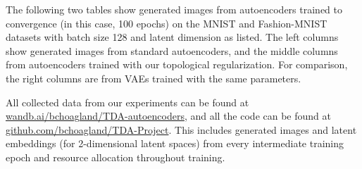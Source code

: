 \documentclass[conference]{IEEEtran}
\begin{document}
The following two tables show generated images from autoencoders trained to convergence (in this case, 100 epochs) on the MNIST and Fashion-MNIST datasets with batch size 128 and latent dimension as listed. The left columns show generated images from standard autoencoders, and the middle columns from autoencoders trained with our topological regularization. For comparison, the right columns are from VAEs trained with the same parameters.

All collected data from our experiments can be found at \href{https://wandb.ai/bchoagland/TDA-autoencoders}{\color{blue}wandb.ai/bchoagland/TDA-autoencoders}, and all the code can be found at \href{https://github.com/BCHoagland/TDA-Project}{\color{blue}github.com/bchoagland/TDA-Project}. This includes generated images and latent embeddings (for 2-dimensional latent spaces) from every intermediate training epoch and resource allocation throughout training.
\end{document}
